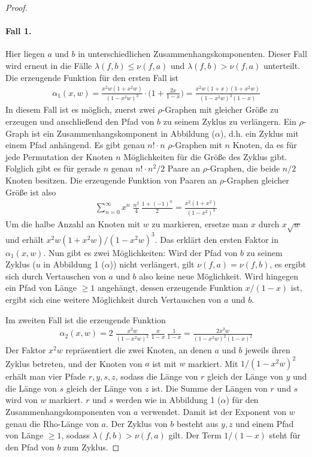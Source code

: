 \documentclass[a4paper, 10pt, ngerman]{article}
\begin{document}
\begin{proof}
    \paragraph{Fall 1.} Hier liegen $a$ und $b$ in unterschiedlichen Zusammenhangskomponenten. Dieser Fall wird erneut in die Fälle $\lambda(f, b) \le \nu(f, a)$ und $\lambda(f, b) > \nu(f, a)$ unterteilt. Die erzeugende Funktion für den ersten Fall ist
    \begin{align*}
        \alpha_1(x, w) = \frac {x^2w(1 + x^2w)} {(1 - x^2w)^3} \cdot \Bigg (1 + \frac {2x} {1 - x} \Bigg ) = \frac {x^2w(1 + x)(1 + x^2w)} {(1 - x^2w)^3(1 - x)}
    \end{align*}
    In diesem Fall ist es möglich, zuerst zwei $\rho$-Graphen mit gleicher Größe zu erzeugen und anschließend den Pfad von $b$ zu seinem Zyklus zu verlängern. Ein $\rho$-Graph ist ein Zusammenhangskomponent in Abbildung ($\alpha$), d.h. ein Zyklus mit einem Pfad anhängend. Es gibt genau $n! \cdot n$ $\rho$-Graphen mit $n$ Knoten, da es für jede Permutation der Knoten $n$ Möglichkeiten für die Größe des Zyklus gibt. Folglich gibt es für gerade $n$ genau $n! \cdot n^2/2$ Paare an $\rho$-Graphen, die beide $n/2$ Knoten besitzen. Die erzeugende Funktion von Paaren an $\rho$-Graphen gleicher Größe ist also
    \begin{align*}
        \sum_{n = 0}^\infty x^n \; \frac {n^2} 4 \, \frac {1 + (-1)^n} 2
        = \frac {x^2(1 + x^2)} {(1 - x^2)^3}
    \end{align*}
    Um die halbe Anzahl an Knoten mit $w$ zu markieren, ersetze man $x$ durch $x \sqrt w$ und erhält $x^2w(1 + x^2w) / (1 - x^2w)^3$. Das erklärt den ersten Faktor in $\alpha_1(x, w)$. Nun gibt es zwei Möglichkeiten: Wird der Pfad von $b$ zu seinem Zyklus ($u$ in Abbildung 1 ($\alpha$)) nicht verlängert, gilt $\nu(f, a) = \nu(f, b)$, es ergibt sich durch Vertauschen von $a$ und $b$ also keine neue Möglichkeit. Wird hingegen ein Pfad von Länge $\ge 1$ angehängt, dessen erzeugende Funktion $x/(1 - x)$ ist, ergibt sich eine weitere Möglichkeit durch Vertauschen von $a$ und $b$.

    \noindent Im zweiten Fall ist die erzeugende Funktion
    \begin{align*}
        \alpha_2(x, w) =
        2 \; \frac {x^2w} {(1 - x^2w)^2} \, \frac x {1 - x} \,
        \frac {1}{1 - x}
        = \frac {2x^3w} {(1 - x^2w)^2 (1 - x)^2}
    \end{align*}
    Der Faktor $x^2w$ repräsentiert die zwei Knoten, an denen $a$ und $b$ jeweils ihren Zyklus betreten, und der Knoten von $a$ ist mit $w$ markiert. Mit $1 / (1 - x^2w)^2$ erhält man vier Pfade $r, y, s, z$, sodass die Länge von $r$ gleich der Länge von $y$ und die Länge von $s$ gleich der Länge von $z$ ist. Die Summe der Längen von $r$ und $s$ wird von $w$ markiert. $r$ und $s$ werden wie in Abbildung 1 ($\alpha$) für den Zusammenhangskomponenten von $a$ verwendet. Damit ist der Exponent von $w$ genau die Rho-Länge von $a$. Der Zyklus von $b$ besteht aus $y, z$ und einem Pfad von Länge $\ge 1$, sodass $\lambda(f, b) > \nu(f, a)$ gilt. Der Term $1 / (1 - x)$ steht für den Pfad von $b$ zum Zyklus.


\end{proof}
\end{document}
